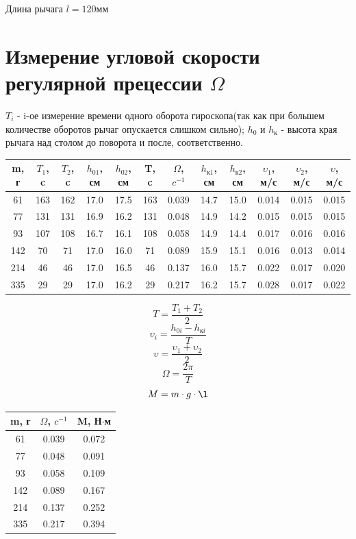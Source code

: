 \documentclass[a4paper, 12pt]{article}
\begin{document}
Длина рычага $l = 120 \text{мм}$

\section{Измерение угловой скорости регулярной прецессии $\Omega$}

$T_i$ - i-ое измерение времени одного оборота гироскопа(так как при большем количестве оборотов рычаг опускается слишком сильно); $h_0 \text{ и }h_{\text{к}}$ - высота края рычага над столом до поворота и после, соответственно.

\begin{center}
\begin{tabular}{|c|c|c|c|c|c|c|c|c|c|c|c|}
\hline
m, г   & $T_1$, c  & $T_2$, c  & $h_{01}$, см  & $h_{02}$, см  & T, c     & $\Omega$, $c^{-1}$  & $h_{\text{к}1}$, см  & $h_{\text{к}2}$, см  & $\upsilon_1$, м/с     & $\upsilon_2$, м/с     & $\upsilon$, м/с       \\ \hline
61  & 163 & 162 & 17.0 & 17.5 & 163 & 0.039 & 14.7 & 15.0 & 0.014 & 0.015 & 0.015 \\ \hline
77  & 131 & 131 & 16.9 & 16.2 & 131 & 0.048 & 14.9 & 14.2 & 0.015 & 0.015 & 0.015 \\ \hline
93  & 107 & 108 & 16.7 & 16.1 & 108 & 0.058 & 14.9 & 14.4 & 0.017 & 0.016 & 0.016 \\ \hline
142 & 70  & 71  & 17.0 & 16.0 & 71  & 0.089 & 15.9 & 15.1 & 0.016 & 0.013 & 0.014 \\ \hline
214 & 46  & 46  & 17.0 & 16.5 & 46  & 0.137  & 16.0 & 15.7 & 0.022 & 0.017 & 0.020\\ \hline
335 & 29  & 29  & 17.0 & 16.2 & 29  & 0.217  & 16.2 & 15.7 & 0.028 & 0.017 & 0.022\\ \hline
\end{tabular}
\end{center}
\[T = \frac{T_1 + T_2}{2}\]
\[\upsilon_i = \frac{h_{0i} - h_{\text{к}i}}{T}\]
\[\upsilon = \frac{\upsilon_1 + \upsilon_2}{2}\]
\[\Omega = \frac{2\pi}{T}\]
\[M = m\cdot g\cdot\l\]
\begin{center}
\begin{tabular}{|c|c|c|}
\hline
m, г   & $\Omega$, $c^{-1}$  & M, Н$\cdot$м     \\ \hline
61  & 0.039 & 0.072 \\ \hline
77  & 0.048 & 0.091 \\ \hline
93  & 0.058 & 0.109 \\ \hline
142 & 0.089 & 0.167 \\ \hline
214 & 0.137  & 0.252 \\ \hline
335 & 0.217  & 0.394 \\ \hline
\end{tabular}
\end{center}
\end{document}
